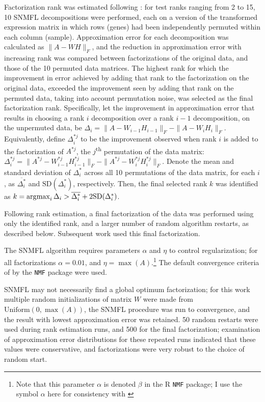 \documentclass[dissertation.tex]{subfiles}
\begin{document}
Factorization rank was estimated following \cite{Frigyesi2008}: for test ranks ranging from 2 to 15, 10 \gls{SNMFL} decompositions were performed, each on a version of the transformed expression matrix in which rows (genes) had been independently permuted within each column (sample).  Approximation error for each decomposition was calculated as $\|A - W H\|_F$, and the reduction in approximation error with increasing rank was compared between factorizations of the original data, and those of the 10 permuted data matrices.  The highest rank for which the improvement in error achieved by adding that rank to the factorization on the original data, exceeded the improvement seen by adding that rank on the permuted data, taking into account permutation noise, was selected as the final factorization rank.  Specifically, let the improvement in approximation error that results in choosing a rank $i$ decomposition over a rank $i-1$ decomposition, on the unpermuted data, be $\Delta_i = \|A - W_{i-1} H_{i-1}\|_F - \|A - W_{i} H_{i}\|_F$.  Equivalently, define $\Delta^{*j}_i$ to be the improvement observed when rank $i$ is added to the factorization of $A^{*j}$, the $j$\textsuperscript{th} permutation of the data matrix: $\Delta^{*j}_i = \|A^{*j} - W^{*j}_{i-1} H^{*j}_{i-1}\|_F - \|A^{*j} - W^{*j}_{i} H^{*j}_{i}\|_F$.  Denote the mean and standard deviation of $\Delta^{*}_i$ across all 10 permutations of the data matrix, for each $i$, as $\overline{\Delta^{*}_i}$ and $\text{SD}(\Delta^{*}_i)$, respectively.  Then, the final selected rank $k$ was identified as $k = \operatorname*{\arg\!\max}_i \Delta_i > \overline{\Delta^{*}_i} + 2 \text{SD}(\Delta^{*}_i)$.

Following rank estimation, a final factorization of the data was performed using only the identified rank, and a larger number of random algorithm restarts, as described below.  Subsequent work used this final factorization.

The \gls{SNMFL} algorithm requires parameters $\alpha$ and $\eta$ to control regularization; for all factorizations $\alpha = 0.01$, and $\eta = \max(A)$.\footnote{Note that this parameter $\alpha$ is denoted $\beta$ in the R \texttt{NMF} package; I use the symbol $\alpha$ here for consistency with \cite{Kim2007}}  The default convergence criteria of by the \texttt{NMF} package were used.

\gls{SNMFL} may not necessarily find a global optimum factorization; for this work multiple random initializations of matrix $W$ were made from $\text{Uniform}(0, \max(A))$, the \gls{SNMFL} procedure was run to convergence, and the result with lowest approximation error was retained.  50 random restarts were used during rank estimation runs, and 500 for the final factorization; examination of approximation error distributions for these repeated runs indicated that these values were conservative, and factorizations were very robust to the choice of random start.
\end{document}
